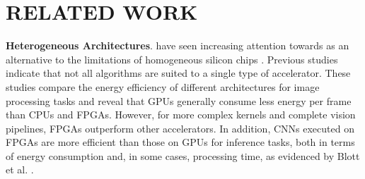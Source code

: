 \documentclass[]{spie}  %
\begin{document}
\section{RELATED WORK}
\label{sec:background}



\textbf{Heterogeneous Architectures}. have seen increasing attention towards as an alternative to the limitations of homogeneous silicon chips \cite{RooLav17, KobRyoFuj20, XieLinKai17, ChoLeeLee22, Hosseinabady2019HeterogeneousFE}. Previous studies \cite{QasDenKri29} indicate that not all algorithms are suited to a single type of accelerator. These studies compare the energy efficiency of different architectures for image processing tasks and reveal that GPUs generally consume less energy per frame than CPUs and FPGAs. However, for more complex kernels and complete vision pipelines, FPGAs outperform other accelerators. In addition, CNNs executed on FPGAs are more efficient than those on GPUs for inference tasks, both in terms of energy consumption and, in some cases, processing time, as evidenced by Blott et al. \cite{BloHalLis}.
\end{document}
